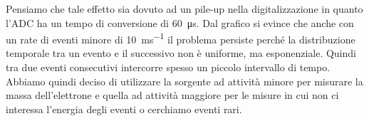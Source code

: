 Pensiamo che tale effetto sia dovuto ad un pile-up nella digitalizzazione in quanto l'ADC ha un tempo di conversione di \SI{60}{\micro s}.
Dal grafico si evince che anche con un rate di eventi minore di \SI{10}{ms^{-1}} il problema persiste perché la distribuzione temporale tra un evento e il successivo non è uniforme, ma esponenziale. Quindi tra due eventi consecutivi intercorre spesso un piccolo intervallo di tempo.
Abbiamo quindi deciso di utilizzare la sorgente ad attività minore per misurare la massa dell'elettrone e quella ad attività maggiore per le misure in cui non ci interessa l'energia degli eventi o cerchiamo eventi rari.